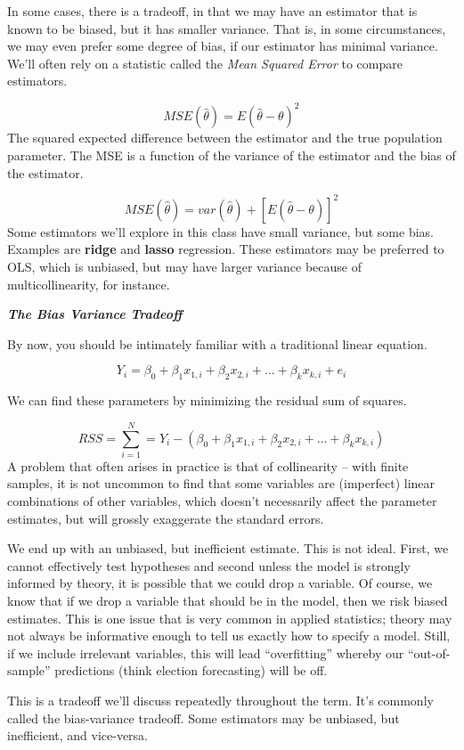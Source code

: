 \documentclass[
]{book}
\begin{document}
In some cases, there is a tradeoff, in that we may have an estimator that is known to be biased, but it has smaller variance. That is, in some circumstances, we may even prefer some degree of bias, if our estimator has minimal variance. We'll often rely on a statistic called the \emph{Mean Squared Error} to compare estimators.

\[MSE(\hat{\theta})=E(\hat{\theta}-\theta)^2\] The squared expected difference between the estimator and the true population parameter. The MSE is a function of the variance of the estimator and the bias of the estimator.

\[MSE(\hat{\theta})=var(\hat{\theta})+[E(\hat{\theta}-\theta)]^2\] Some estimators we'll explore in this class have small variance, but some bias. Examples are \textbf{ridge} and \textbf{lasso} regression. These estimators may be preferred to OLS, which is unbiased, but may have larger variance because of multicollinearity, for instance.

\textbf{\emph{The Bias Variance Tradeoff}}

By now, you should be intimately familiar with a traditional linear equation.

\[Y_i=\beta_0+\beta_1 x_{1,i}+\beta_2 x_{2,i}+\dots+\beta_k x_{k,i}+e_i\]

We can find these parameters by minimizing the residual sum of squares.

\[RSS=\sum_{i=1}^N=Y_i-(\beta_0+\beta_1 x_{1,i}+\beta_2 x_{2,i}+\dots+\beta_k x_{k,i})\] A problem that often arises in practice is that of collinearity -- with finite samples, it is not uncommon to find that some variables are (imperfect) linear combinations of other variables, which doesn't necessarily affect the parameter estimates, but will grossly exaggerate the standard errors.

We end up with an unbiased, but inefficient estimate. This is not ideal. First, we cannot effectively test hypotheses and second unless the model is strongly informed by theory, it is possible that we could drop a variable. Of course, we know that if we drop a variable that should be in the model, then we risk biased estimates. This is one issue that is very common in applied statistics; theory may not always be informative enough to tell us exactly how to specify a model. Still, if we include irrelevant variables, this will lead ``overfitting'' whereby our ``out-of-sample'' predictions (think election forecasting) will be off.

This is a tradeoff we'll discuss repeatedly throughout the term. It's commonly called the bias-variance tradeoff. Some estimators may be unbiased, but inefficient, and vice-versa.
\end{document}
